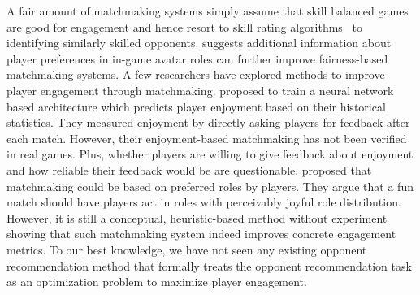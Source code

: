 A fair amount of matchmaking systems simply assume that skill balanced games are good for engagement \cite{graepel2006ranking,sweetser2005gameflow,flow1990psychology,chen2007flow} and hence resort to skill rating algorithms~\cite{glickman1999parameter,elo1978rating,herbrich:trueskill} to identifying similarly skilled opponents. \cite{myslak2014developing} suggests additional information about player preferences in in-game avatar roles can further improve fairness-based matchmaking systems. A few researchers have explored methods to improve player engagement through matchmaking. \cite{Delalleau2012} proposed to train a neural network based architecture which predicts player enjoyment based on their historical statistics. They measured enjoyment by directly asking players for feedback after each match. However, their enjoyment-based matchmaking has not been verified in real games. Plus, whether players are willing to give feedback about enjoyment and how reliable their feedback would be are questionable. \cite{jimenez2011matchmaking} proposed that matchmaking could be based on preferred roles by players. They argue that a fun match should have players act in  roles with perceivably joyful role distribution. However, it is still a conceptual, heuristic-based method without experiment showing that such matchmaking system indeed improves concrete engagement metrics. To our best knowledge, we have not seen any existing opponent recommendation method that formally treats the opponent recommendation task as an optimization problem to maximize player engagement. 








